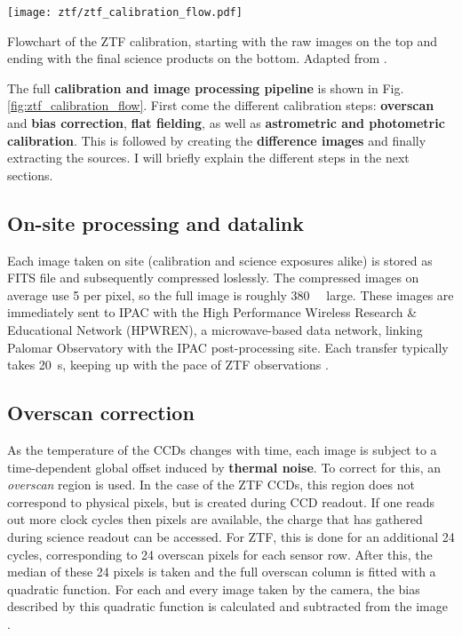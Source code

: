 \begin{marginfigure}
    \texttt{[image: ztf/ztf\_calibration\_flow.pdf]}
    \caption[ZTF realtime flowchart]{Flowchart of the ZTF calibration, starting with the raw images on the top and ending with the final science products on the bottom. Adapted from \cite{Laher2018}.}
\end{marginfigure}

The full \textbf{calibration and image processing pipeline} is shown in Fig. \ref{fig:ztf_calibration_flow}. First come the different calibration steps: \textbf{overscan} and \textbf{bias correction}, \textbf{flat fielding}, as well as \textbf{astrometric and photometric calibration}. This is followed by creating the \textbf{difference images} and finally extracting the sources. I will briefly explain the different steps in the next sections.

\subsection{On-site processing and datalink}\label{ztf_data_link}

Each image taken on site (calibration and science exposures alike) is stored as FITS file and subsequently compressed loslessly. The compressed images on average use \SI{5}{\bit} per pixel, so the full image is roughly \SI{380}{\mega\byte} large. These images are immediately sent to IPAC with the High Performance Wireless Research \& Educational Network (HPWREN), a microwave-based data network, linking Palomar Observatory with the IPAC post-processing site. Each transfer typically takes \SI{20}{\second}, keeping up with the pace of ZTF observations \cite{Dekany2020}.

\subsection{Overscan correction}
As the temperature of the CCDs changes with time, each image is subject to a time-dependent global offset induced by \textbf{thermal noise}. To correct for this, an \textit{overscan} region is used. In the case of the ZTF CCDs, this region does not correspond to physical pixels, but is created during CCD readout. If one reads out more clock cycles then pixels are available, the charge that has gathered during science readout can be accessed. For ZTF, this is done for an additional 24 cycles, corresponding to 24 overscan pixels for each sensor row. After this, the median of these 24 pixels is taken and the full overscan column is fitted with a quadratic function. For each and every image taken by the camera, the bias described by this quadratic function is calculated and subtracted from the image \cite{Masci2019a}.

